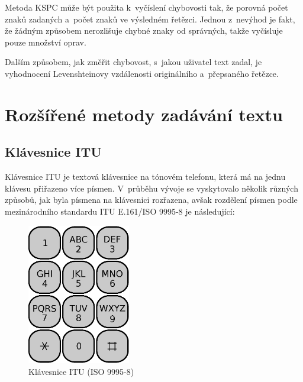 \documentclass[a4paper,11pt,openany]{book} %
\begin{document}
Metoda KSPC může být použita k~vyčíslení chybovosti tak, že porovná počet znaků zadaných a~počet znaků ve výsledném řetězci. Jednou z~nevýhod je fakt, že žádným způsobem nerozlišuje chybné znaky od správných, takže vyčísluje pouze množství oprav. %

Dalším způsobem, jak změřit chybovost, s~jakou uživatel text zadal, je vyhodnocení Levenshteinovy vzdálenosti originálního a~přepsaného řetězce. \parencite{soukoreff2001measuring} %

\chapter{Rozšířené metody zadávání textu}\label{input-methods}

\section{Klávesnice ITU}\label{itu-kb}

Klávesnice ITU je textová klávesnice na tónovém telefonu, která má na jednu klávesu přiřazeno více písmen. V~průběhu vývoje se vyskytovalo několik různých způsobů, jak byla písmena na klávesnici rozřazena, avšak rozdělení písmen podle mezinárodního standardu ITU E.161/ISO 9995-8 je následující: %

\begin{figure}[h]
	\centering
	\includegraphics[width=0.4\textwidth]{telephone-keypad.eps}
	\caption{Klávesnice ITU (ISO 9995-8)\protect\footnotemark}
	\label{fig:phoneKeyboard}
\end{figure}

\end{document}
